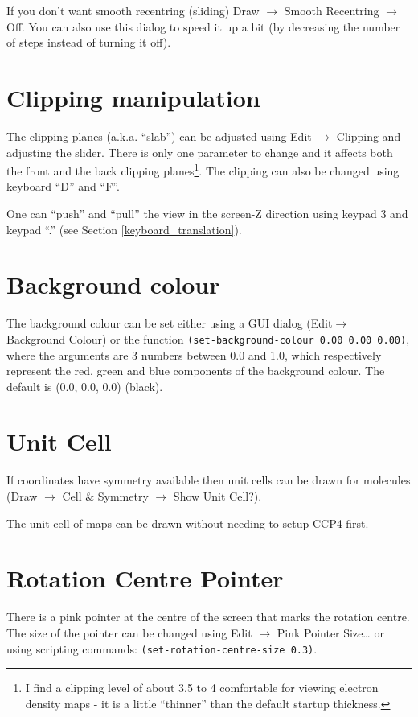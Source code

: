 \documentclass{book}
\begin{document}
If you don't want smooth recentring (sliding)
\textsf{Draw $\rightarrow$ Smooth Recentring $\rightarrow$ Off}.  You
can also use this dialog to speed it up a bit (by decreasing the
number of steps instead of turning it off).

\section{Clipping manipulation}
\label{clipping manipulation}
 The clipping planes (a.k.a. ``slab'') can
be adjusted using \textsf{Edit $\rightarrow$ Clipping} and adjusting
the slider.  There is only one parameter to change and it affects both
the front and the back clipping planes\footnote{I find a clipping
  level of about 3.5 to 4 comfortable for viewing electron density
  maps - it is a little ``thinner'' than the default startup
  thickness.}.
The clipping can also be changed using keyboard ``D'' and ``F''.

One can ``push'' and ``pull'' the view in the screen-Z direction using
keypad 3 and keypad ``.'' (see Section \ref{keyboard_translation}).

\section{Background colour}
The background colour can be set either using a GUI dialog
(\textsf{Edit$ \rightarrow$ Background Colour}) or the function
\texttt{(set-background-colour 0.00 0.00 0.00)}, where the arguments
are 3 numbers between 0.0 and 1.0, which respectively represent the
red, green and blue components of the background colour.  The default
is (0.0, 0.0, 0.0) (black).

\section{Unit Cell}
 If coordinates have symmetry available then unit
cells can be drawn for molecules (\textsf{Draw $\rightarrow$ Cell \&
  Symmetry $\rightarrow$ Show Unit Cell?}).

The unit cell of maps can be drawn without needing to setup CCP4 first.

\section{Rotation Centre Pointer}
 There is a pink pointer at the centre of the screen that marks the rotation centre.
The size of the pointer can be changed using \textsf{Edit
  $\rightarrow$ Pink Pointer Size\ldots} or using scripting commands:
\texttt{(set-rotation-centre-size 0.3)}.
\end{document}
